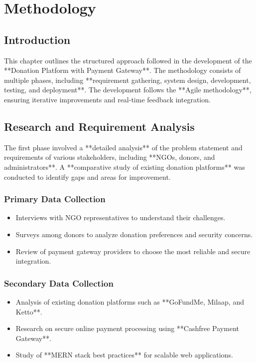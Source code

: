 \chapter{Methodology}

\section{Introduction}
This chapter outlines the structured approach followed in the development of the **Donation Platform with Payment Gateway**. The methodology consists of multiple phases, including **requirement gathering, system design, development, testing, and deployment**. The development follows the **Agile methodology**, ensuring iterative improvements and real-time feedback integration.

\section{Research and Requirement Analysis}
The first phase involved a **detailed analysis** of the problem statement and requirements of various stakeholders, including **NGOs, donors, and administrators**. A **comparative study of existing donation platforms** was conducted to identify gaps and areas for improvement.

\subsection{Primary Data Collection}
\begin{itemize}
    \item Interviews with NGO representatives to understand their challenges.
    \item Surveys among donors to analyze donation preferences and security concerns.
    \item Review of payment gateway providers to choose the most reliable and secure integration.
\end{itemize}

\subsection{Secondary Data Collection}
\begin{itemize}
    \item Analysis of existing donation platforms such as **GoFundMe, Milaap, and Ketto**.
    \item Research on secure online payment processing using **Cashfree Payment Gateway**.
    \item Study of **MERN stack best practices** for scalable web applications.
\end{itemize}

